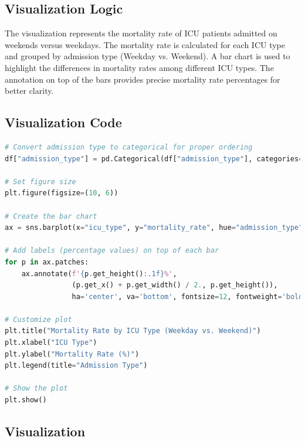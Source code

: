 \documentclass[a4paper,10pt]{article}
\begin{document}
\subsection{Visualization Logic}
The visualization represents the mortality rate of ICU patients admitted on weekends versus weekdays. The mortality rate is calculated for each ICU type and grouped by admission type (Weekday vs. Weekend). A bar chart is used to highlight the differences in mortality rates among different ICU types. The annotation on top of the bars provides precise mortality rate percentages for better clarity.

\subsection{Visualization Code}
\begin{lstlisting}[language=Python]
# Convert admission type to categorical for proper ordering
df["admission_type"] = pd.Categorical(df["admission_type"], categories=["Weekday", "Weekend"], ordered=True)

# Set figure size
plt.figure(figsize=(10, 6))

# Create the bar chart
ax = sns.barplot(x="icu_type", y="mortality_rate", hue="admission_type", data=df, palette="coolwarm")

# Add labels (percentage values) on top of each bar
for p in ax.patches:
    ax.annotate(f'{p.get_height():.1f}%', 
                (p.get_x() + p.get_width() / 2., p.get_height()), 
                ha='center', va='bottom', fontsize=12, fontweight='bold', color='black')

# Customize plot
plt.title("Mortality Rate by ICU Type (Weekday vs. Weekend)")
plt.xlabel("ICU Type")
plt.ylabel("Mortality Rate (%)")
plt.legend(title="Admission Type")

# Show the plot
plt.show()
\end{lstlisting}

\subsection{Visualization}
\end{document}
